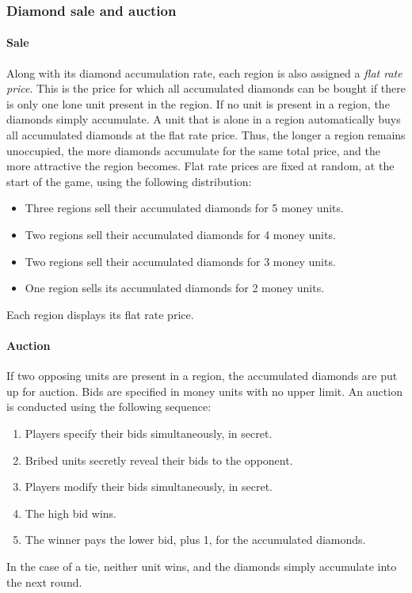 \documentclass[12pt]{article}
\begin{document}
\subsubsection{Diamond sale and auction}

\paragraph{Sale}
Along with its diamond accumulation rate, each region is also assigned a {\it flat rate price}.  This is the price for which all accumulated diamonds can be bought if there is only one lone unit present in the region.  If no unit is present in a region, the diamonds simply accumulate.  A unit that is alone in a region automatically buys all accumulated diamonds at the flat rate price.  Thus, the longer a region remains unoccupied, the more diamonds accumulate for the same total price, and the more attractive the region becomes.  Flat rate prices are fixed at random, at the start of the game, using the following distribution:
\begin{itemize}
\item Three regions sell their accumulated diamonds for 5 money units.
\item Two regions sell their accumulated diamonds for 4 money units.
\item Two regions sell their accumulated diamonds for 3 money units.
\item One region sells its accumulated diamonds for 2 money units.
\end{itemize}
Each region displays its flat rate price.

\paragraph{Auction}
If two opposing units are present in a region, the accumulated diamonds are put up for auction.  Bids are specified in money units with no upper limit.  An auction is conducted using the following sequence:
\begin{enumerate}
\item Players specify their bids simultaneously, in secret.
\item Bribed units secretly reveal their bids to the opponent.
\item Players modify their bids simultaneously, in secret.
\item The high bid wins.
\item The winner pays the lower bid, plus 1, for the accumulated diamonds.
\end{enumerate}
In the case of a tie, neither unit wins, and the diamonds simply accumulate into the next round.
\end{document}
